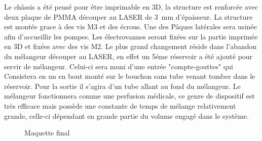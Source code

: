 \documentclass[a4paper, 11pt]{article}
\begin{document}
Le châssis a été pensé pour être imprimable en 3D, la structure est renforcée avec deux
plaque de PMMA découper au LASER de 3 mm d'épaisseur. La structure est montée grace à
des vis M3 et des écrous. Une des Pâques latérales sera usinée afin d'accueillir les pompes.
Les électrovannes seront fixées sur la partie imprimée en 3D et fixées avec des vis M2.
Le plus grand changement réside dans l'abandon du mélangeur découper au LASER, en effet un 5éme réservoir a été ajouté pour servir de mélangeur. Celui-ci sera muni d'une entrée "compte-gouttes" qui
Consistera en un en bout monté sur le bouchon sans tube venant tomber dans le réservoir.
Pour la sortie il s'agira d'un tube allant au fond du mélangeur.
Le mélangeur fonctionnera comme une perfusion médicale, ce genre de dispositif est très efficace
mais possède une constante de temps de mélange relativement grande, celle-ci dépendant en
grande partie du volume engagé dans le système.
\begin{figure}[H]
    \centering
    \caption{Maquette final}
    \label{fig:Maquette}
\end{figure}
\newpage
\end{document}
